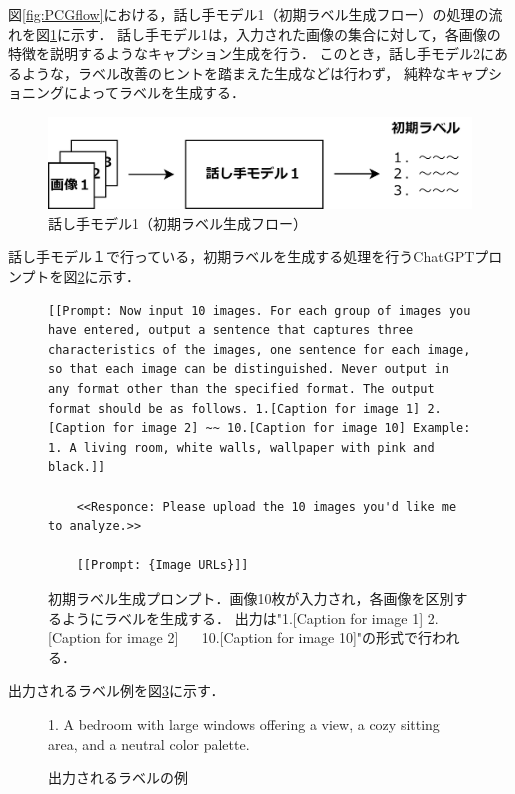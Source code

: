 \documentclass[a4paper,11pt]{jreport}
\begin{document}
図\ref{fig:PCGflow}における，話し手モデル1（初期ラベル生成フロー）の処理の流れを図\ref{fig:PCGspeaker1}に示す．
話し手モデル1は，入力された画像の集合に対して，各画像の特徴を説明するようなキャプション生成を行う．
このとき，話し手モデル2にあるような，ラベル改善のヒントを踏まえた生成などは行わず，
純粋なキャプショニングによってラベルを生成する．

\begin{figure}[H]
	\centering
	\includegraphics[width=0.8\linewidth]{figures/PCGspeaker1.png}
	\caption{話し手モデル1（初期ラベル生成フロー）}
	\label{fig:PCGspeaker1}
\end{figure}

話し手モデル１で行っている，初期ラベルを生成する処理を行うChatGPTプロンプトを図\ref{fig:prompt_speaker1}に示す．


\begin{figure}[h]
  \centering
  \begin{mdframed}
  \begin{lstlisting}[style=chatgptstyle]
    [[Prompt: Now input 10 images. For each group of images you have entered, output a sentence that captures three characteristics of the images, one sentence for each image, so that each image can be distinguished. Never output in any format other than the specified format. The output format should be as follows. 1.[Caption for image 1] 2.[Caption for image 2] ~~ 10.[Caption for image 10] Example: 1. A living room, white walls, wallpaper with pink and black.]]

    <<Responce: Please upload the 10 images you'd like me to analyze.>>

    [[Prompt: {Image URLs}]]
  \end{lstlisting}
  \end{mdframed}
  \caption{初期ラベル生成プロンプト．画像10枚が入力され，各画像を区別するようにラベルを生成する．
  出力は"1.[Caption for image 1] 2.[Caption for image 2] ~~ 10.[Caption for image 10]"の形式で行われる．}
  \label{fig:prompt_speaker1}
\end{figure}

出力されるラベル例を図\ref{fig:firstlabel_example}に示す．

\begin{figure}[H]
  \begin{mdframed}[linewidth=1pt]
    1. A bedroom with large windows offering a view, a cozy sitting area, and a neutral color palette.
  \end{mdframed}
  \caption{出力されるラベルの例}
  \label{fig:firstlabel_example}
\end{figure}
\end{document}
